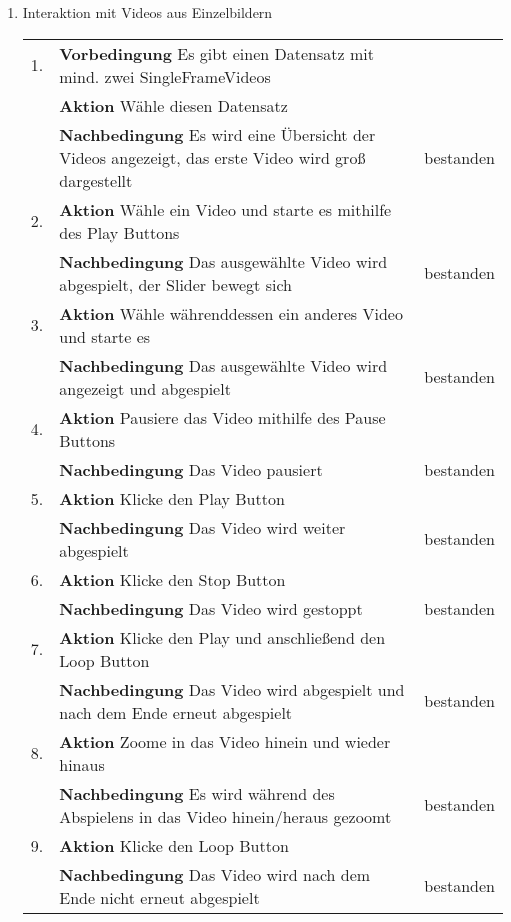\begin{enumerate} [label=\bfseries /TS \arabic*0/, leftmargin=*]
	\item Interaktion mit Videos aus Einzelbildern \newline \newline
	\begin{tabular}{rp{4in}|l}
	1. & \textbf{Vorbedingung} Es gibt einen Datensatz mit mind. zwei SingleFrameVideos & \\
	   & \textbf{Aktion} Wähle diesen Datensatz & \\
	   & \textbf{Nachbedingung} Es wird eine Übersicht der Videos angezeigt, das erste Video wird groß dargestellt & bestanden \\
	\hline
	2. & \textbf{Aktion} Wähle ein Video und starte es mithilfe des Play Buttons & \\
	   & \textbf{Nachbedingung} Das ausgewählte Video wird abgespielt, der Slider bewegt sich & bestanden \\
	\hline
	3. & \textbf{Aktion} Wähle währenddessen ein anderes Video und starte es & \\
	   & \textbf{Nachbedingung} Das ausgewählte Video wird angezeigt und abgespielt & bestanden \\
	\hline
	4. & \textbf{Aktion} Pausiere das Video mithilfe des Pause Buttons & \\
	   & \textbf{Nachbedingung} Das Video pausiert & bestanden \\
	\hline
	5. & \textbf{Aktion} Klicke den Play Button & \\
	   & \textbf{Nachbedingung} Das Video wird weiter abgespielt & bestanden \\
	\hline
	6. & \textbf{Aktion} Klicke den Stop Button & \\
	   & \textbf{Nachbedingung} Das Video wird gestoppt & bestanden \\
	\hline
	7. & \textbf{Aktion} Klicke den Play und anschließend den Loop Button & \\
	   & \textbf{Nachbedingung} Das Video wird abgespielt und nach dem Ende erneut abgespielt & bestanden \\
	\hline
	8. & \textbf{Aktion} Zoome in das Video hinein und wieder hinaus & \\
	   & \textbf{Nachbedingung} Es wird während des Abspielens in das Video hinein/heraus gezoomt & bestanden \\
	\hline
	9. & \textbf{Aktion} Klicke den Loop Button & \\
	   & \textbf{Nachbedingung} Das Video wird nach dem Ende nicht erneut abgespielt & bestanden \\

\end{tabular}
\end{enumerate}
